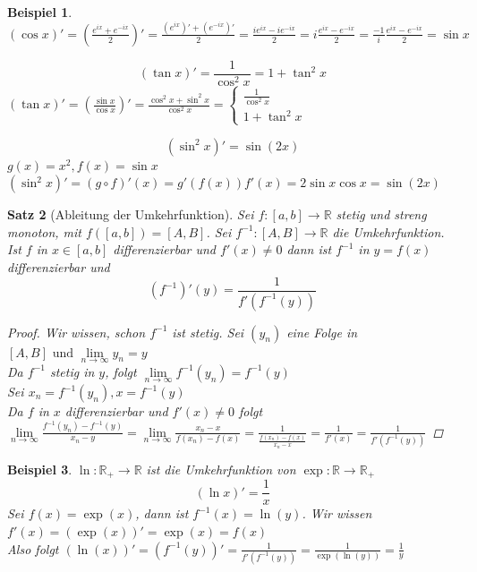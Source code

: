 \documentclass[a4paper,titlepage,oneside]{article}
\def\R{\ensuremath{\mathbb{R}} }
\def\im{\ensuremath{\mathit{i}} }
\def\e{\ensuremath{\mathit{e}} }
\renewcommand{\liminf}[2][n]{\ensuremath{\lim\limits_{#1 \rightarrow \infty}{#2}}}
\theoremstyle{thmstyle}
\newtheorem{satz}{Satz}[section]
\newtheorem{bsp}[satz]{Beispiel}
\theoremstyle{subthmstyle}
\begin{document}
\begin{bsp}
$\displaystyle  (\cos x)' = \left( \frac{\e^{\im x} + \e^{-\im x}}{2}\right)' = \frac{(\e^{\im x})' + (\e^{-\im x})'}{2} = \frac{\im \e^{\im x} - \im \e^{-\im x}}{2} = \im \frac{\e^{\im x} - \e^{-\im x}}{2} =  \frac{-1}{\im} \frac{\e^{\im x} - \e^{-\im x}}{2} = \sin x $
\item \[ (\tan x)' = \frac{1}{\cos^2  x} = 1 + \tan^2 x\]
$(\tan x)' = \left( \frac{\sin x}{\cos x} \right)' = \frac{\cos^2 x + \sin^2 x}{\cos^2 x} =\begin{cases} \frac{1}{\cos^2  x} \\ 1 + \tan^2 x \end{cases}$
\item \[(\sin^2 x)' = \sin (2x)\]
$g(x) = x^2, f(x) = \sin x$ \\
$(\sin^2 x)' = (g \circ f)'(x) = g'(f(x))f'(x) = 2 \sin x \cos x = \sin (2x)$
\end{bsp}

\begin{satz}[Ableitung der Umkehrfunktion]
Sei $f : [a,b] \to \R $ stetig und streng monoton, mit $f([a,b]) = [A,B]$. Sei $f^{-1} : [A,B] \to \R$ die Umkehrfunktion.
Ist $f$ in $x \in [a,b]$ differenzierbar und $f'(x) \ne 0$ dann ist $f^{-1}$ in $y = f(x)$ differenzierbar und \[(f^{-1})' (y) = \frac{1}{f'(f^{-1}(y))}\]
\begin{proof}
Wir wissen, schon $f^{-1}$ ist stetig. Sei $(y_n)$ eine Folge in $[A, B] \text{ und } \liminf{y_n} = y$\\
Da $f^{-1}$ stetig in $y$, folgt $\liminf{f^{-1}(y_n)} = f^{-1}(y)$\\
Sei $x_n = f^{-1}(y_n), x= f^{-1}(y)$\\
Da $f$ in $x$ differenzierbar und $f'(x) \ne 0$ folgt \\
$ \displaystyle \liminf{\frac{f^{-1}(y_n) - f^{-1}(y)}{x_n - y}} = \liminf{\frac{x_n - x}{f(x_n)-f(x)}} = \frac{1}{\frac{f(x_n) - f(x)}{x_n - x}} = \frac{1}{f'(x)} = \frac{1}{f'(f^{-1}(y))}$
\end{proof}
\end{satz}

\begin{bsp}
$\ln : \R_+ \to \R$ ist die Umkehrfunktion von $\exp: \R \to \R_+$
\[(\ln x)' = \frac{1}{x}\]
Sei $f(x) = \exp(x)$, dann ist $f^{-1}(x) = \ln(y)$. Wir wissen $f'(x) = (\exp(x))' = \exp(x) = f(x)$\\
Also folgt $ \displaystyle (\ln(x))' = (f^{-1}(y))' = \frac{1}{f'(f^{-1}(y))} = \frac{1}{\exp(\ln(y))} = \frac{1}{y}$
\end{bsp}
\end{document}
